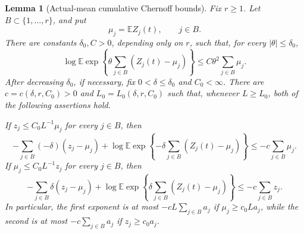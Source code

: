 \documentclass[11pt]{article}
\newtheorem{lemma}[theorem]{Lemma}
\theoremstyle{remark}
\newcommand{\Ee}{\mathbb E}
\begin{document}
\begin{lemma}[Actual-mean cumulative Chernoff bounds]\label{lem:actual-mean-lower-cumulative-chernoff}
Fix \(r\ge1\).  Let \(B\subset\{1,\ldots,r\}\), and put
\[
        \mu_j=\Ee Z_j(t),\qquad j\in B.
\]
There are constants \(\delta_0,C>0\), depending only on \(r\), such that,
for every \(|\theta|\le\delta_0\),
\[
\log \Ee\exp\left\{\theta\sum_{j\in B}(Z_j(t)-\mu_j)\right\}
        \le C\theta^2\sum_{j\in B}\mu_j .
\]
After decreasing \(\delta_0\), if necessary, fix
\(0<\delta\le\delta_0\) and \(C_0<\infty\).  There are
\(c=c(\delta,r,C_0)>0\) and \(L_0=L_0(\delta,r,C_0)\) such that, whenever
\(L\ge L_0\), both of the following assertions hold.

If \(z_j\le C_0L^{-1}\mu_j\) for every \(j\in B\), then
\[
        -\sum_{j\in B}(-\delta)(z_j-\mu_j)
        +\log \Ee\exp\left\{-\delta\sum_{j\in B}(Z_j(t)-\mu_j)\right\}
        \le -c\sum_{j\in B}\mu_j .
\]
If \(\mu_j\le C_0L^{-1}z_j\) for every \(j\in B\), then
\[
        -\sum_{j\in B}\delta(z_j-\mu_j)
        +\log \Ee\exp\left\{\delta\sum_{j\in B}(Z_j(t)-\mu_j)\right\}
        \le -c\sum_{j\in B}z_j .
\]
In particular, the first exponent is at most
\(-cL\sum_{j\in B}a_j\) if \(\mu_j\ge c_0La_j\), while the second is at most
\(-c\sum_{j\in B}a_j\) if \(z_j\ge c_0a_j\).
\end{lemma}
\end{document}
